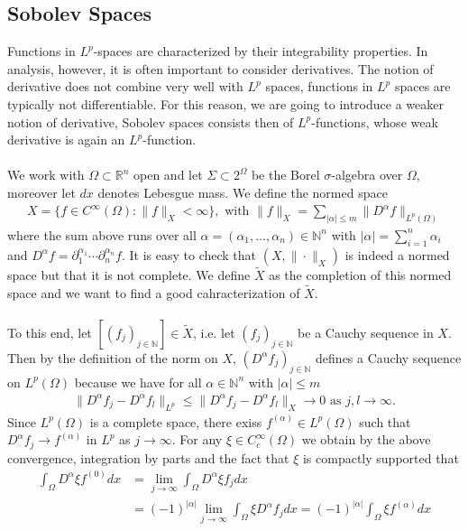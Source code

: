 \documentclass[11pt,a4paper]{article}
\theoremstyle{definition}
\begin{document}
\subsection{Sobolev Spaces}
Functions in $L^p$-spaces are characterized by their integrability properties. In analysis, however, it is often important to consider derivatives. The notion of derivative does not combine very well with $L^p$ spaces, functions in $L^p$ spaces are typically not differentiable. For this reason, we are going to introduce a weaker notion of derivative, Sobolev spaces consists then of $L^p$-functions, whose weak derivative is again an $L^p$-function. 
\\\\
We work with $\Omega \subset \mathbb{R}^n$ open and let $ \Sigma \subset 2^\Omega$ be the Borel $\sigma$-algebra over $\Omega$, moreover let $dx$ denotes Lebesgue mass. We define the normed space 
\begin{align*}
X = \lbrace f \in C^\infty( \Omega): \|f\|_X < \infty \rbrace, \text{ with } \|f\|_X = \sum_{ | \alpha| \leq m } \| D^\alpha f \|_{L^p(\Omega)}
\end{align*}
where the sum above runs over all $\alpha = ( \alpha_1, \dots , \alpha_n) \in \mathbb{N}^n$ with $|\alpha| = \sum_{i=1}^n \alpha_i$ and $D^\alpha f = \partial_1^{\alpha_1} \cdots \partial_n^{\alpha_n} f$. It is easy to check that $(X, \| \cdot \|_X)$ is indeed a normed space but that it is not complete. We define $\tilde{X}$ as the completion of this normed space and we want to find a good cahracterization of $\tilde{X}$.
\\\\
To this end, let $[(f_j)_{j \in \mathbb{N}}] \in \tilde{X}$, i.e. let $(f_j)_{j \in \mathbb{N}}$ be a Cauchy sequence in $X$.  Then by the definition of the norm on $X$, $(D^\alpha f_j)_{j \in \mathbb{N}}$ defines a Cauchy sequence on $L^p( \Omega)$ because we have for all $\alpha \in \mathbb{N}^n$ with $| \alpha| \leq m$
\begin{align*}
\| D^\alpha f_j - D^\alpha f_l \|_{L^p} \leq \| D^\alpha f_j - D^\alpha f_l\|_X \to 0 \text{ as } j,l \to \infty. 
\end{align*}
Since $L^p( \Omega)$ is a complete space, there exiss $f^{(\alpha)} \in L^p( \Omega)$ such that $D^\alpha f_j \to f^{(\alpha)}$ in $L^p$ as $j \to \infty$. For any $\xi \in C_c^\infty( \Omega)$ we obtain by the above convergence, integration by parts and the fact that $\xi$ is compactly supported that 
\begin{align*}
\int_\Omega D^\alpha \xi f^{(0)} dx &= \lim_{j \to \infty} \int_\Omega D^\alpha \xi f_j dx  \\ &= (-1)^ {| \alpha|} \lim_{j \to \infty}  \int_\Omega \xi D^\alpha f_j dx = (-1)^{| \alpha|} \int_\Omega \xi f^{( \alpha)} dx
\end{align*}
\end{document}
